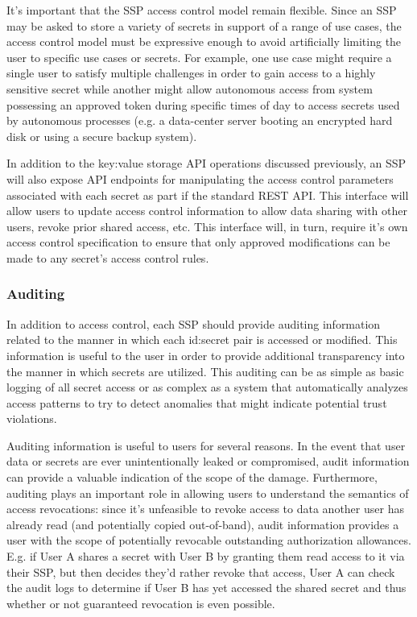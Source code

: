 It's important that the SSP access control model remain
flexible. Since an SSP may be asked to store a variety of secrets in
support of a range of use cases, the access control model must be
expressive enough to avoid artificially limiting the user to specific
use cases or secrets. For example, one use case might require a single
user to satisfy multiple challenges in order to gain access to a
highly sensitive secret while another might allow autonomous access
from system possessing an approved token during specific times of day
to access secrets used by autonomous processes (e.g. a data-center
server booting an encrypted hard disk or using a secure backup
system).

In addition to the key:value storage API operations discussed
previously, an SSP will also expose API endpoints for manipulating the
access control parameters associated with each secret as part if the
standard REST API. This interface will allow users to update access
control information to allow data sharing with other users, revoke
prior shared access, etc. This interface will, in turn, require it's
own access control specification to ensure that only approved
modifications can be made to any secret's access control rules.

\subsubsection{Auditing}

In addition to access control, each SSP should provide auditing
information related to the manner in which each id:secret pair is
accessed or modified. This information is useful to the user in order
to provide additional transparency into the manner in which secrets
are utilized. This auditing can be as simple as basic logging of all
secret access or as complex as a system that automatically analyzes
access patterns to try to detect anomalies that might indicate
potential trust violations.

Auditing information is useful to users for several reasons. In the
event that user data or secrets are ever unintentionally leaked or
compromised, audit information can provide a valuable indication of
the scope of the damage. Furthermore, auditing plays an important role
in allowing users to understand the semantics of access revocations:
since it's unfeasible to revoke access to data another user has
already read (and potentially copied out-of-band), audit information
provides a user with the scope of potentially revocable outstanding
authorization allowances. E.g. if User A shares a secret with User B
by granting them read access to it via their SSP, but then decides
they'd rather revoke that access, User A can check the audit logs to
determine if User B has yet accessed the shared secret and thus
whether or not guaranteed revocation is even possible.

